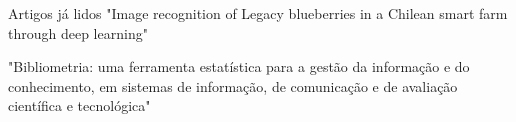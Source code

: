 \begin{frame}[t]{Artigos já lidos}
    \newcommand\vertspacelidos{0.35cm}
    "Image recognition of Legacy blueberries in a Chilean smart farm through deep learning"\cite{blueberryrecognition}
    \vspace*{\vertspacelidos}

    "Bibliometria: uma ferramenta estatística para a gestão da informação e do conhecimento, em sistemas de informação, de comunicação e de avaliação científica e tecnológica"\cite{guedes2005bibliometria}
    \vspace*{\vertspacelidos}
\end{frame}
